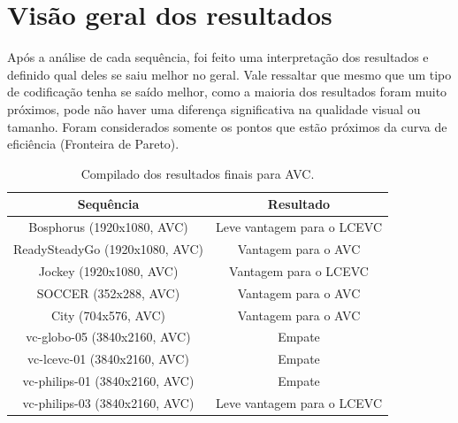 \newpage
\section{Visão geral dos resultados}

Após a análise de cada sequência, foi feito uma interpretação dos resultados e definido
qual deles se saiu melhor no geral. Vale ressaltar que mesmo que um tipo de codificação
tenha se saído melhor, como a maioria dos resultados foram muito próximos, pode não haver
uma diferença significativa na qualidade visual ou tamanho. Foram considerados somente os
pontos que estão próximos da curva de eficiência (Fronteira de Pareto).

\begin{table}[h]
    \centering
    \begin{tabular}{|c|c|}
        \hline
        \textbf{Sequência} & \textbf{Resultado}\\
        \hline
        Bosphorus (1920x1080, AVC) & Leve vantagem para o LCEVC\\
        \hline
        ReadySteadyGo (1920x1080, AVC) & Vantagem para o AVC\\
        \hline
        Jockey (1920x1080, AVC) & Vantagem para o LCEVC\\
        \hline
        SOCCER (352x288, AVC) & Vantagem para o AVC\\
        \hline
        City (704x576, AVC) & Vantagem para o AVC\\
        \hline
        vc-globo-05 (3840x2160, AVC) & Empate\\
        \hline
        vc-lcevc-01 (3840x2160, AVC) & Empate\\
        \hline
        vc-philips-01 (3840x2160, AVC) & Empate\\
        \hline
        vc-philips-03 (3840x2160, AVC) & Leve vantagem para o LCEVC\\
        \hline
    \end{tabular}
    \caption{Compilado dos resultados finais para AVC.}
    \label{tab:results-avc}
\end{table}

